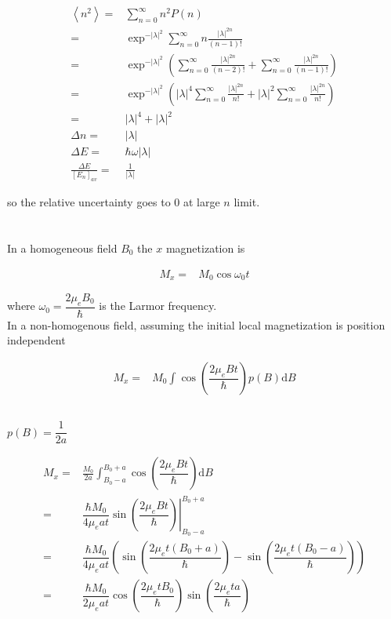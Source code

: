 \documentclass[10pt,fleqn]{article}
\newcommand{\ud}{\mathrm{d}}
\newcommand{\eqar}[1]
{
  \begin{align*}
    #1
  \end{align*}
}
\newcommand{\paren}[1]{{\left({#1}\right)}}
\newcommand{\abs}[1]{{\left|{#1}\right|}}
\newcommand{\sqr}[1]{{\left[{#1}\right]}}
\newcommand{\angl}[1]{{\left\langle{#1}\right\rangle}}
\begin{document}
\subsection{}
\eqar{
  \angl{n^2}=&\sum_{n=0}^\infty n^2P\paren{n}\\
  =&\exp^{-\abs{\lambda}^2}\sum_{n=0}^\infty n\frac{\abs{\lambda}^{2n}}{(n-1)!}\\
  =&\exp^{-\abs{\lambda}^2}\paren{\sum_{n=0}^\infty \frac{\abs{\lambda}^{2n}}{(n-2)!}+\sum_{n=0}^\infty \frac{\abs{\lambda}^{2n}}{(n-1)!}}\\
  =&\exp^{-\abs{\lambda}^2}\paren{\abs{\lambda}^4\sum_{n=0}^\infty \frac{\abs{\lambda}^{2n}}{n!}+\abs{\lambda}^2\sum_{n=0}^\infty \frac{\abs{\lambda}^{2n}}{n!}}\\
  =&\abs{\lambda}^4+\abs{\lambda}^2\\
  \Delta n=&\abs{\lambda}\\
  \Delta E=&\hbar\omega\abs{\lambda}\\
  \frac{\Delta E}{\sqr{E_n}_{av}}=&\frac{1}{\abs{\lambda}}
}
so the relative uncertainty goes to $0$ at large $n$ limit.
\section{}
In a homogeneous field $B_0$ the $x$ magnetization is
\eqar{
  M_x=&M_0\cos\omega_0t
}
where $\omega_0=\dfrac{2\mu_eB_0}{\hbar}$ is the Larmor frequency.\\
In a non-homogenous field, assuming the initial local magnetization is position
independent
\eqar{
  M_x=&M_0\int\cos\paren{\dfrac{2\mu_eBt}{\hbar}}p(B)\ud B
}
\subsection{}
$p(B)=\dfrac{1}{2a}$
\eqar{
  M_x=&\frac{M_0}{2a}\int^{B_0+a}_{B_0-a}\cos\paren{\dfrac{2\mu_eBt}{\hbar}}\ud B\\
  =&\dfrac{\hbar M_0}{4\mu_eat}\left.\sin\paren{\dfrac{2\mu_eBt}{\hbar}}\right|^{B_0+a}_{B_0-a}\\
  =&\dfrac{\hbar M_0}{4\mu_eat}\paren{\sin\paren{\dfrac{2\mu_et(B_0+a)}{\hbar}}-\sin\paren{\dfrac{2\mu_et(B_0-a)}{\hbar}}}\\
  =&\dfrac{\hbar M_0}{2\mu_eat}\cos\paren{\dfrac{2\mu_etB_0}{\hbar}}\sin\paren{\dfrac{2\mu_eta}{\hbar}}
}
\end{document}
